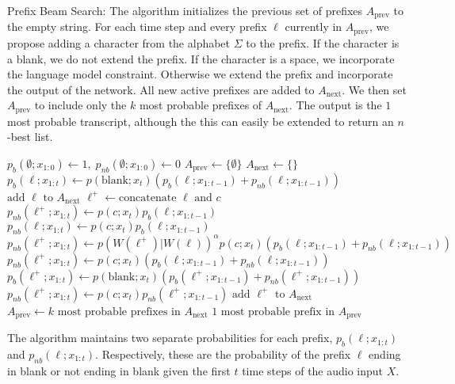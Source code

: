 \begin{algorithm}[bt]
  \caption{Prefix Beam Search: The algorithm initializes the previous set of
prefixes $A_\text{prev}$ to the empty string. For each time step and every
prefix $\ell$ currently in $A_\text{prev}$, we propose adding a character from the
alphabet $\Sigma$ to the prefix. If the character is a blank, we do not extend
the prefix. If the character is a space, we incorporate the language model
constraint. Otherwise we extend the prefix and incorporate the output of the
network. All new active prefixes are added to $A_\text{next}$. We then set
$A_\text{prev}$ to include only the $k$ most probable prefixes of $A_\text{next}$.
The output is the $1$ most probable transcript, although the this can easily
be extended to return an $n$-best list.}\label{alg:decode}
  \begin{algorithmic}
    \State $p_b(\emptyset; x_{1:0}) \gets 1,\; p_{nb}(\emptyset; x_{1:0}) \gets 0$
    \State $A_{\text{prev}} \gets \{\emptyset\}$ 
      \State $A_{\text{next}} \gets \{\}$
	    \State $p_b(\ell; x_{1:t}) \gets p(\text{blank}; x_t) 
		(p_b(\ell ; x_{1:t-1}) + p_{nb}(\ell ; x_{1:t-1}))$
	    \State $\mbox{add } \ell \mbox{ to } A_{\text{next}}$
	  \Else
	    \State $\ell^+ \gets \mbox{concatenate }\ell \mbox{ and } c$
	      \State $p_{nb}(\ell^+; x_{1:t}) \gets p(c; x_t)p_b(\ell ; x_{1:t-1})$
	      \State $p_{nb}(\ell; x_{1:t}) \gets p(c; x_t)p_b(\ell ; x_{1:t-1})$
	    \State $p_{nb}(\ell^+; x_{1:t}) \gets p(W(\ell^+)| W(\ell))^\alpha 
		p(c; x_t)(p_b(\ell ; x_{1:t-1}) + p_{nb}(\ell ; x_{1:t-1}))$
	    \Else
	      \State $p_{nb}(\ell^+; x_{1:t}) \gets p(c; x_t)
		(p_b(\ell; x_{1:t-1}) + p_{nb}(\ell; x_{1:t-1}))$
	    \EndIf
	      \State $p_{b}(\ell^+; x_{1:t}) \gets p(\text{blank}; x_t)
		(p_b(\ell^+; x_{1:t-1}) + p_{nb}(\ell^+; x_{1:t-1}))$
	      \State $p_{nb}(\ell^+; x_{1:t}) \gets p(c; x_t)p_{nb}(\ell^+; x_{1:t-1})$
	    \EndIf
	    \State $\mbox{add } \ell^+ \mbox{ to } A_{\text{next}}$
	  \EndIf
	\EndFor
      \EndFor
      \State $A_{\text{prev}} \gets k 
	\text{ most probable prefixes in } A_{\text{next}}$
    \EndFor
    \State \Return $1 \text{ most probable prefix in } A_{\text{prev}}$
  \end{algorithmic}
\end{algorithm}
The algorithm maintains two separate probabilities for each prefix,
$p_{b}(\ell; x_{1:t})$ and $p_{nb}(\ell; x_{1:t})$. Respectively, these are the
probability of the prefix $\ell$ ending in blank or not ending in blank given
the first $t$ time steps of the audio input $X$.

